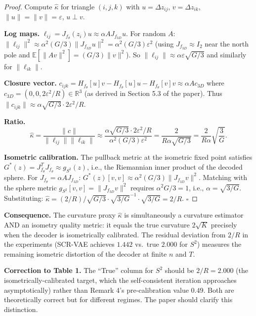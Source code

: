 \documentclass[11pt]{article}
\newcommand{\R}{\mathbb{R}}
\newcommand{\E}{\mathbb{E}}
\begin{document}
\begin{bridgebox}
\begin{proof}
Compute $\hat{\kappa}$ for triangle $(i,j,k)$ with $u = \Delta z_{ij}$,
$v = \Delta z_{ik}$, $\|u\| = \|v\| = \varepsilon$, $u \perp v$.

\textbf{Log maps.} $\ell_{ij} = J_{f_\theta}(z_i) u \approx \alpha A J_{f_{3D}} u$.
For random $A$: $\|\ell_{ij}\|^2 \approx \alpha^2 (G/3) \|J_{f_{3D}} u\|^2
= \alpha^2 (G/3) \varepsilon^2$ (using $J_{f_{3D}} \approx I_2$ near the north pole
and $\E[\|Av\|^2] = (G/3)\|v\|^2$).
So $\|\ell_{ij}\| \approx \alpha \varepsilon \sqrt{G/3}$ and similarly for
$\|\ell_{ik}\|$.

\textbf{Closure vector.} $c_{ijk} = H_{f_\theta}[u]v - H_{f_\theta}[u]u
- H_{f_\theta}[v]v \approx \alpha A c_{3D}$ where $c_{3D} = (0,0,2\varepsilon^2/R)
\in \R^3$ (as derived in Section 5.3 of the paper). Thus $\|c_{ijk}\| \approx
\alpha \sqrt{G/3} \cdot 2\varepsilon^2/R$.

\textbf{Ratio.}
\[
    \hat\kappa = \frac{\|c\|}{\|\ell_{ij}\|\|\ell_{ik}\|}
    \approx \frac{\alpha \sqrt{G/3} \cdot 2\varepsilon^2/R}{\alpha^2 (G/3) \varepsilon^2}
    = \frac{2}{R\alpha\sqrt{G/3}}
    = \frac{2}{R\alpha}\sqrt{\frac{3}{G}}.
\]

\textbf{Isometric calibration.}
The pullback metric at the isometric fixed point satisfies $G^*(z) = J_{f_\theta}^T
J_{f_\theta} \approx g_{S^2}(z)$, i.e., the Riemannian inner product of the
decoded sphere. For $J_{f_\theta} = \alpha A J_{f_{3D}}$:
$G^*(z)[v,v] \approx \alpha^2 (G/3) \|J_{f_{3D}} v\|^2$. Matching with the
sphere metric $g_{S^2}[v,v] = \|J_{f_{3D}} v\|^2$ requires $\alpha^2 G/3 = 1$,
i.e., $\alpha = \sqrt{3/G}$. Substituting:
$\hat\kappa = (2/R)/\sqrt{G/3} \cdot \sqrt{3/G}^{-1} \cdot \sqrt{3/G} = 2/R$.
$\square$
\end{proof}

\textbf{Consequence.}
The curvature proxy $\hat\kappa$ is simultaneously a curvature estimator AND an
isometry quality metric: it equals the true curvature $2\sqrt{K}$ precisely when
the decoder is isometrically calibrated. The residual deviation from $2/R$ in the
experiments (SCR-VAE achieves $1.442$ vs.\ true $2.000$ for $S^2$) measures the
remaining isometric distortion of the decoder at finite $n$ and $T$.

\textbf{Correction to Table 1.}
The ``True'' column for $S^2$ should be $2/R = 2.000$ (the isometrically-calibrated
target, which the self-consistent iteration approaches asymptotically) rather than
Remark 4's pre-calibration value $0.49$. Both are theoretically correct but for
different regimes. The paper should clarify this distinction.
\end{bridgebox}
\end{document}
